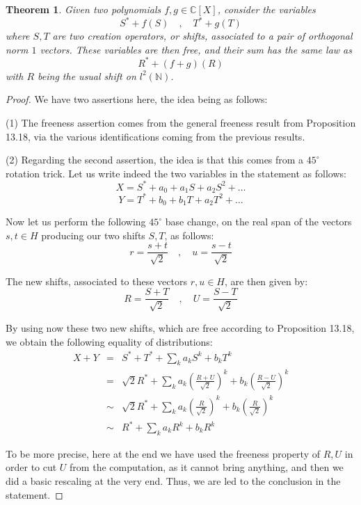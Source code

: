 \documentclass[12pt]{amsbook}
\newtheorem{theorem}{Theorem}[chapter]
\begin{document}

\begin{theorem}
Given two polynomials $f,g\in\mathbb C[X]$, consider the variables 
$$S^*+f(S)\quad,\quad 
T^*+g(T)$$
where $S,T$ are two creation operators, or shifts, associated to a pair of  orthogonal norm $1$ vectors. These variables are then free, and their sum has the same law as
$$R^*+(f+g)(R)$$
with $R$ being the usual shift on $l^2(\mathbb N)$.
\end{theorem}

\begin{proof}
We have two assertions here, the idea being as follows:

\medskip

(1) The freeness assertion comes from the general freeness result from Proposition 13.18, via the various identifications coming from the previous results.

\medskip

(2) Regarding the second assertion, the idea is that this comes from a $45^\circ$ rotation trick. Let us write indeed the two variables in the statement as follows:
$$X=S^*+a_0+a_1S+a_2S^2+\ldots$$
$$Y=T^*+b_0+b_1T+a_2T^2+\ldots$$

Now let us perform the following $45^\circ$ base change, on the real span of the vectors $s,t\in H$ producing our two shifts $S,T$, as follows:
$$r=\frac{s+t}{\sqrt{2}}\quad,\quad 
u=\frac{s-t}{\sqrt{2}}$$

The new shifts, associated to these vectors $r,u\in H$, are then given by:
$$R=\frac{S+T}{\sqrt{2}}\quad,\quad
U=\frac{S-T}{\sqrt{2}}$$

By using now these two new shifts, which are free according to Proposition 13.18, we obtain the following equality of distributions:
\begin{eqnarray*}
X+Y
&=&S^*+T^*+\sum_ka_kS^k+b_kT^k\\
&=&\sqrt{2}R^*+\sum_ka_k\left(\frac{R+U}{\sqrt{2}}\right)^k+b_k\left(\frac{R-U}{\sqrt{2}}\right)^k\\
&\sim&\sqrt{2}R^*+\sum_ka_k\left(\frac{R}{\sqrt{2}}\right)^k+b_k\left(\frac{R}{\sqrt{2}}\right)^k\\
&\sim&R^*+\sum_ka_kR^k+b_kR^k
\end{eqnarray*}

To be more precise, here at the end we have used the freeness property of $R,U$ in order to cut $U$ from the computation, as it cannot bring anything, and then we did a basic rescaling at the very end. Thus, we are led to the conclusion in the statement.
\end{proof}
\end{document}
